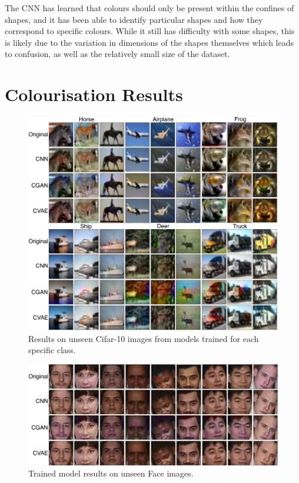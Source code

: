 \documentclass{l4proj}
\begin{document}
The CNN has learned that colours should only be present within the confines of shapes, and it has been able to identify particular shapes and how they correspond to specific colours. While it still has difficulty with some shapes, this is likely due to the variation in dimensions of the shapes themselves which leads to confusion, as well as the relatively small size of the dataset.

\section{Colourisation Results}

\begin{figure}[H]
    \centering
    \includegraphics[width=1.0\linewidth]{images/Cifar10Eval.png}    
    \caption{Results on unseen Cifar-10 images from models trained for each specific class.}
    \label{fig:cifar10eval} 
\end{figure}

\begin{figure}[H]
    \includegraphics[width=1.0\linewidth]{images/FaceEval.png}   
    \caption{Trained model results on unseen Face images.}
    \label{fig:faceeval} 
\end{figure}
\end{document}
